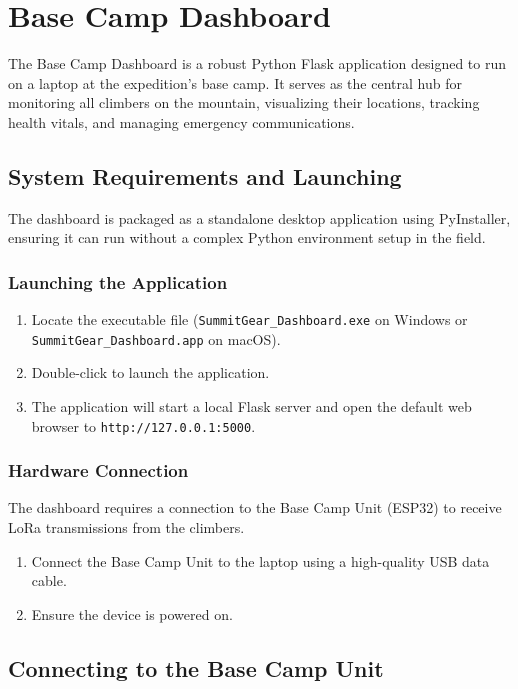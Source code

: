 \chapter{Base Camp Dashboard}
\label{ch:dashboard}

The Base Camp Dashboard is a robust Python Flask application designed to run on a laptop at the expedition's base camp. It serves as the central hub for monitoring all climbers on the mountain, visualizing their locations, tracking health vitals, and managing emergency communications.

\section{System Requirements and Launching}

The dashboard is packaged as a standalone desktop application using PyInstaller, ensuring it can run without a complex Python environment setup in the field.

\subsection{Launching the Application}
\begin{enumerate}
    \item Locate the executable file (\texttt{SummitGear\_Dashboard.exe} on Windows or \texttt{SummitGear\_Dashboard.app} on macOS).
    \item Double-click to launch the application.
    \item The application will start a local Flask server and open the default web browser to \texttt{http://127.0.0.1:5000}.
\end{enumerate}

\subsection{Hardware Connection}
The dashboard requires a connection to the Base Camp Unit (ESP32) to receive LoRa transmissions from the climbers.

\begin{enumerate}
    \item Connect the Base Camp Unit to the laptop using a high-quality USB data cable.
    \item Ensure the device is powered on.
\end{enumerate}

\section{Connecting to the Base Camp Unit}

